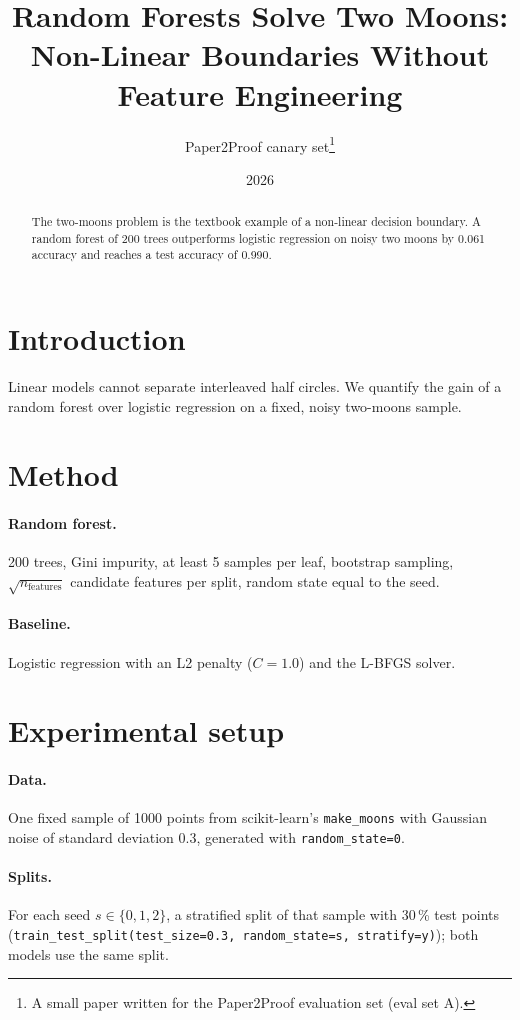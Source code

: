 \documentclass[11pt]{article}
\title{Random Forests Solve Two Moons: Non-Linear Boundaries Without Feature Engineering}
\author{Paper2Proof canary set\thanks{A small paper written for the Paper2Proof evaluation set (eval set A).}}
\date{2026}
\begin{document}
\maketitle

\begin{abstract}
The two-moons problem is the textbook example of a non-linear decision boundary. A random forest
of 200 trees outperforms logistic regression on noisy two moons by 0.061 accuracy and reaches a
test accuracy of 0.990.
\end{abstract}

\section{Introduction}
Linear models cannot separate interleaved half circles. We quantify the gain of a random forest
over logistic regression on a fixed, noisy two-moons sample.

\section{Method}
\paragraph{Random forest.} 200 trees, Gini impurity, at least 5 samples per leaf, bootstrap
sampling, $\sqrt{n_\text{features}}$ candidate features per split, random state equal to the seed.
\paragraph{Baseline.} Logistic regression with an L2 penalty ($C = 1.0$) and the L-BFGS solver.

\section{Experimental setup}
\paragraph{Data.} One fixed sample of 1000 points from scikit-learn's \texttt{make\_moons} with
Gaussian noise of standard deviation 0.3, generated with \texttt{random\_state=0}.
\paragraph{Splits.} For each seed $s \in \{0, 1, 2\}$, a stratified split of that sample with
30\,\% test points (\texttt{train\_test\_split(test\_size=0.3, random\_state=s, stratify=y)});
both models use the same split.
\end{document}
